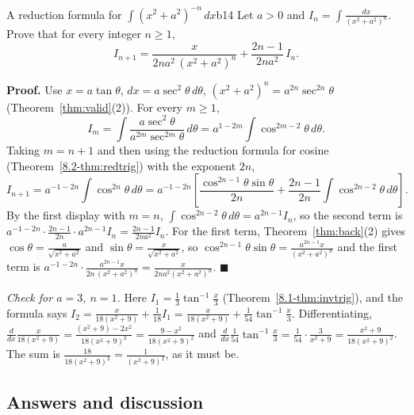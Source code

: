 \documentclass[11pt]{article}
\begin{document}
\begin{exmp}{A reduction formula for $\int(x^2+a^2)^{-n}\,dx$}{b14}
Let $a>0$ and $I_n=\int\frac{dx}{(x^2+a^2)^n}$. Prove that for every integer $n\ge1$,
\[I_{n+1}=\frac{x}{2na^2\,(x^2+a^2)^n}+\frac{2n-1}{2na^2}\,I_n .\]

\textbf{Proof.} Use $x=a\tan\theta$, $dx=a\sec^2\theta\,d\theta$, $(x^2+a^2)^n=a^{2n}\sec^{2n}\theta$ (Theorem~\ref{thm:valid}(2)). For every $m\ge1$,
\[I_m=\int\frac{a\sec^2\theta}{a^{2m}\sec^{2m}\theta}\,d\theta=a^{1-2m}\int\cos^{2m-2}\theta\,d\theta .\]
Taking $m=n+1$ and then using the reduction formula for cosine (Theorem~\ref{8.2-thm:redtrig}) with the exponent $2n$,
\[I_{n+1}=a^{-1-2n}\int\cos^{2n}\theta\,d\theta=a^{-1-2n}\left[\frac{\cos^{2n-1}\theta\sin\theta}{2n}+\frac{2n-1}{2n}\int\cos^{2n-2}\theta\,d\theta\right] .\]
By the first display with $m=n$, $\int\cos^{2n-2}\theta\,d\theta=a^{2n-1}I_n$, so the second term is $a^{-1-2n}\cdot\frac{2n-1}{2n}\cdot a^{2n-1}I_n=\frac{2n-1}{2na^2}I_n$. For the first term, Theorem~\ref{thm:back}(2) gives $\cos\theta=\frac a{\sqrt{x^2+a^2}}$ and $\sin\theta=\frac x{\sqrt{x^2+a^2}}$, so $\cos^{2n-1}\theta\sin\theta=\frac{a^{2n-1}x}{(x^2+a^2)^{n}}$ and the first term is $a^{-1-2n}\cdot\frac{a^{2n-1}x}{2n\,(x^2+a^2)^n}=\frac{x}{2na^2(x^2+a^2)^n}$. $\blacksquare$

\emph{Check for $a=3$, $n=1$.} Here $I_1=\frac13\tan^{-1}\frac x3$ (Theorem~\ref{8.1-thm:invtrig}), and the formula says $I_2=\frac x{18(x^2+9)}+\frac1{18}I_1=\frac x{18(x^2+9)}+\frac1{54}\tan^{-1}\frac x3$. Differentiating, $\frac{d}{dx}\frac x{18(x^2+9)}=\frac{(x^2+9)-2x^2}{18(x^2+9)^2}=\frac{9-x^2}{18(x^2+9)^2}$ and $\frac{d}{dx}\frac1{54}\tan^{-1}\frac x3=\frac1{54}\cdot\frac3{x^2+9}=\frac{x^2+9}{18(x^2+9)^2}$. The sum is $\frac{18}{18(x^2+9)^2}=\frac1{(x^2+9)^2}$, as it must be.
\end{exmp}

\subsection*{Answers and discussion}
\end{document}

